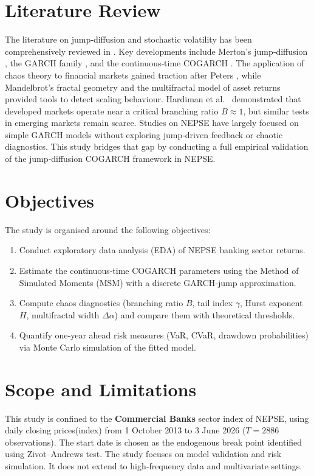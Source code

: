 \section{Literature Review}
The literature on jump‑diffusion and stochastic volatility has been comprehensively reviewed in \cite{kluppelberg2004continuous}. Key developments include Merton’s jump‑diffusion \cite{merton1976option}, the GARCH family \cite{engle1982autoregressive, bollerslev1986generalized}, and the continuous‑time COGARCH \cite{kluppelberg2004continuous}. The application of chaos theory to financial markets gained traction after Peters \cite{peters1994fractal}, while Mandelbrot’s fractal geometry \cite{mandelbrot2013fractals} and the multifractal model of asset returns \cite{calvet2002multifractality} provided tools to detect scaling behaviour. Hardiman et al.\ \cite{hardiman2013critical} demonstrated that developed markets operate near a critical branching ratio $B \approx 1$, but similar tests in emerging markets remain scarce. Studies on NEPSE have largely focused on simple GARCH models \cite{gajurel2021volatility} without exploring jump‑driven feedback or chaotic diagnostics. This study bridges that gap by conducting a full empirical validation of the jump‑diffusion COGARCH framework in NEPSE.

\section{Objectives}
The study is organised around the following objectives:
\begin{enumerate}[label=(\roman*)]
    \item Conduct exploratory data analysis (EDA) of NEPSE banking sector returns.
    \item Estimate the continuous‑time COGARCH parameters using the Method of Simulated Moments (MSM) with a discrete GARCH‑jump approximation.
    \item Compute chaos diagnostics (branching ratio $B$, tail index $\gamma$, Hurst exponent $H$, multifractal width $\Delta\alpha$) and compare them with theoretical thresholds.
    \item Quantify one‑year ahead risk measures (VaR, CVaR, drawdown probabilities) via Monte Carlo simulation of the fitted model.
\end{enumerate}

\section{Scope and Limitations}
This study is confined to the \textbf{Commercial Banks} sector index of NEPSE, using daily closing prices(index) from 1 October 2013 to 3 June 2026 ($T=2886$ observations). The start date is chosen as the endogenous break point identified using Zivot–Andrews test. The study focuses on model validation and risk simulation. It does not extend to high‑frequency data and multivariate settings.

